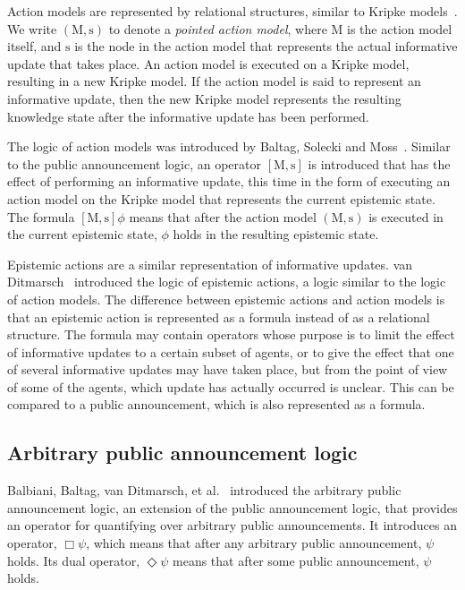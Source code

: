 Action models are represented by relational structures, similar to Kripke
models~\cite{vanditmarsch2007dynamic}. We write $(\mathrm{M,s})$ to denote a
{\em pointed action model}, where $\mathrm{M}$ is the action model itself, and
$\mathrm{s}$ is the node in the action model that represents the actual
informative update that takes place. An action model is executed on a Kripke
model, resulting in a new Kripke model. If the action model is said to represent
an informative update, then the new Kripke model represents the resulting
knowledge state after the informative update has been performed.

The logic of action models was introduced by Baltag, Solecki and
Moss~\cite{baltag2004logics}. Similar to the public announcement logic, an
operator $[\mathrm{M, s}]$ is introduced that has the effect of performing an
informative update, this time in the form of executing an action model on the
Kripke model that represents the current epistemic state. The formula
$[\mathrm{M,s}]\phi$ means that after the action model $(\mathrm{M, s})$ is
executed in the current epistemic state, $\phi$ holds in the resulting epistemic
state. 

Epistemic actions are a similar representation of informative updates.
van
Ditmarsch~\cite{vanditmarsch1999logic,vanditmarsch2001knowledge,vanditmarsch2007dynamic}
introduced the logic of epistemic actions, a logic similar to the logic of
action models. The difference between epistemic actions and action models is
that an epistemic action is represented as a formula instead of as a relational
structure. The formula may contain operators whose purpose is to limit the
effect of informative updates to a certain subset of agents, or to give the
effect that one of several informative updates may have taken place, but from
the point of view of some of the agents, which update has actually occurred is
unclear. This can be compared to a public announcement, which is also
represented as a formula.

\subsection{Arbitrary public announcement logic}

Balbiani, Baltag, van Ditmarsch, et al.~\cite{balbiani2007arbitrary} introduced
the arbitrary public announcement logic, an extension of the public announcement
logic, that provides an operator for quantifying over arbitrary public
announcements. It introduces an operator, $\Box\psi$, which means that after
any arbitrary public announcement, $\psi$ holds. Its dual operator,
$\Diamond\psi$ means that after some public announcement, $\psi$ holds.

